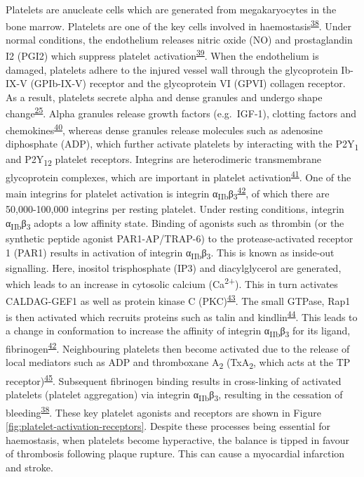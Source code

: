 \documentclass[11pt,twoside]{bristolthesis}
\begin{document}
Platelets are anucleate cells which are generated from megakaryocytes in the bone marrow. Platelets are one of the key cells involved in haemostasis\textsuperscript{\protect\hyperlink{ref-Rivera2009}{38}}. Under normal conditions, the endothelium releases nitric oxide (NO) and prostaglandin I2 (PGI2) which suppress platelet activation\textsuperscript{\protect\hyperlink{ref-Yau2015}{39}}. When the endothelium is damaged, platelets adhere to the injured vessel wall through the glycoprotein Ib-IX-V (GPIb-IX-V) receptor and the glycoprotein VI (GPVI) collagen receptor. As a result, platelets secrete alpha and dense granules and undergo shape change\textsuperscript{\protect\hyperlink{ref-Badimon2012}{25}}. Alpha granules release growth factors (e.g.~IGF-1), clotting factors and chemokines\textsuperscript{\protect\hyperlink{ref-Gear2003}{40}}, whereas dense granules release molecules such as adenosine diphosphate (ADP), which further activate platelets by interacting with the P2Y\textsubscript{1} and P2Y\textsubscript{12} platelet receptors. Integrins are heterodimeric transmembrane glycoprotein complexes, which are important in platelet activation\textsuperscript{\protect\hyperlink{ref-Durrant2017a}{41}}. One of the main integrins for platelet activation is integrin α\textsubscript{IIb}β\textsubscript{3}\textsuperscript{\protect\hyperlink{ref-Huang2019}{42}}, of which there are 50,000-100,000 integrins per resting platelet. Under resting conditions, integrin α\textsubscript{IIb}β\textsubscript{3} adopts a low affinity state. Binding of agonists such as thrombin (or the synthetic peptide agonist PAR1-AP/TRAP-6) to the protease-activated receptor 1 (PAR1) results in activation of integrin α\textsubscript{IIb}β\textsubscript{3}. This is known as inside-out signalling. Here, inositol trisphosphate (IP3) and diacylglycerol are generated, which leads to an increase in cytosolic calcium (Ca\textsuperscript{2+}). This in turn activates CALDAG-GEF1 as well as protein kinase C (PKC)\textsuperscript{\protect\hyperlink{ref-Mehrbod2013}{43}}. The small GTPase, Rap1 is then activated which recruits proteins such as talin and kindlin\textsuperscript{\protect\hyperlink{ref-Durrant2017}{44}}. This leads to a change in conformation to increase the affinity of integrin α\textsubscript{IIb}β\textsubscript{3} for its ligand, fibrinogen\textsuperscript{\protect\hyperlink{ref-Huang2019}{42}}. Neighbouring platelets then become activated due to the release of local mediators such as ADP and thromboxane A\textsubscript{2} (TxA\textsubscript{2}, which acts at the TP receptor)\textsuperscript{\protect\hyperlink{ref-Offermanns2006}{45}}. Subsequent fibrinogen binding results in cross-linking of activated platelets (platelet aggregation) via integrin α\textsubscript{IIb}β\textsubscript{3}, resulting in the cessation of bleeding\textsuperscript{\protect\hyperlink{ref-Rivera2009}{38}}. These key platelet agonists and receptors are shown in Figure \ref{fig:platelet-activation-receptors}. Despite these processes being essential for haemostasis, when platelets become hyperactive, the balance is tipped in favour of thrombosis following plaque rupture. This can cause a myocardial infarction and stroke.
\end{document}
